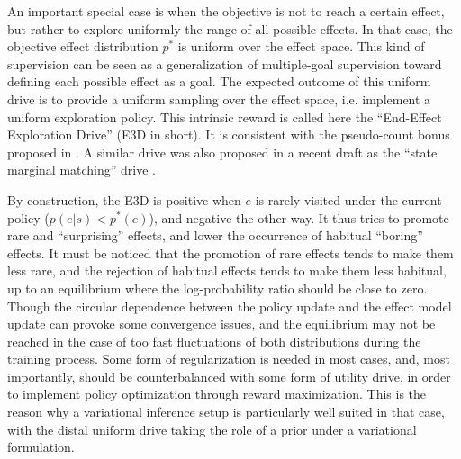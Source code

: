 \documentclass[runningheads]{llncs}
\begin{document}
An important special case is when the objective is not to reach a certain effect, but rather to explore uniformly the range of all possible effects. In that case, the objective effect distribution $p^*$ is uniform over the effect space. This kind of supervision can be seen as a generalization of multiple-goal supervision \cite{haarnoja2017reinforcement} toward defining each possible effect as a goal.  The expected outcome of this uniform drive is to provide a uniform sampling over the effect space, i.e. implement a uniform exploration policy. This intrinsic reward is called here the ``End-Effect Exploration Drive'' (E3D in short). It is consistent with the pseudo-count bonus proposed in \cite{bellemare2016unifying}. A similar drive was also proposed in a recent draft as the ``state marginal matching'' drive \cite{lee2019efficient}.


By construction, the E3D is positive when $e$ is rarely visited under the current policy ($p(e|s) < p^*(e)$), and negative the other way. It thus tries to promote rare and ``surprising'' effects, and lower the occurrence of habitual ``boring'' effects. It must be noticed that the promotion of rare effects tends to make them less rare, and the rejection of habitual effects tends to make them less habitual, up to an equilibrium where the log-probability ratio should be close to zero. 
Though the circular dependence between the policy update and the effect model update can provoke some convergence issues, and the 
 equilibrium may not be reached in the case of too fast fluctuations of both distributions during the training process. 
Some form of regularization is needed in most cases, and, most importantly, should be counterbalanced with some form of utility drive, in order to implement policy optimization through reward maximization.
This is the reason why a variational inference setup is particularly well suited in that case, with the distal uniform drive taking the role of a prior under a variational formulation. 

\end{document}
